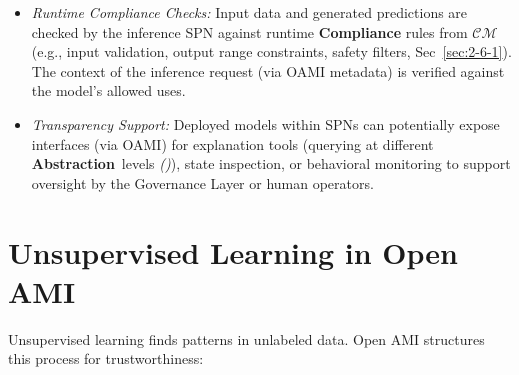 \documentclass[12pt,a4paper]{report}
\renewcommand{\citep}[1]{\textit{\scriptsize{(\cite{#1})}}}
\newcommand{\Abstraction}{\textbf{Abstraction}}
\begin{document}
\begin{itemize}
\begin{itemize}
			\item \textit{Runtime Compliance Checks:} Input data and generated predictions are checked by the inference SPN against runtime \textbf{Compliance} rules from $\mathcal{CM}$ (e.g., input validation, output range constraints, safety filters, Sec~\ref{sec:2-6-1}). The context of the inference request (via OAMI metadata) is verified against the model's allowed uses.
			\item \textit{Transparency Support:} Deployed models within SPNs can potentially expose interfaces (via OAMI) for explanation tools (querying at different \Abstraction\ levels \citep{Anthropic_Decompose_2023}), state inspection, or behavioral monitoring to support oversight by the Governance Layer or human operators.
		\end{itemize}
	\end{itemize}
	
	\section{Unsupervised Learning in Open AMI} %
	\label{sec:3-4} %
	
	Unsupervised learning finds patterns in unlabeled data. Open AMI structures this process for trustworthiness:
	
\end{document}
